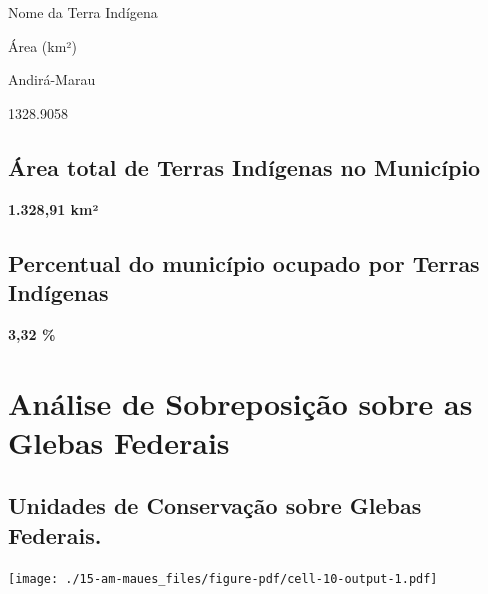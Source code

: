 \documentclass[
  letterpaper,
]{report}
\begin{document}
\n  

\n    

\n      

Nome da Terra Indígena

\n      

Área (km²)

\n    

\n  

\n  

\n    

\n      

Andirá-Marau

\n      

1328.9058

\n    

\n  

\n

\hypertarget{uxe1rea-total-de-terras-induxedgenas-no-municuxedpio}{%
\subsection{Área total de Terras Indígenas no
Município}\label{uxe1rea-total-de-terras-induxedgenas-no-municuxedpio}}

\textbf{1.328,91 km²}

\hypertarget{percentual-do-municuxedpio-ocupado-por-terras-induxedgenas}{%
\subsection{Percentual do município ocupado por Terras
Indígenas}\label{percentual-do-municuxedpio-ocupado-por-terras-induxedgenas}}

\textbf{3,32 \%}

\hypertarget{anuxe1lise-de-sobreposiuxe7uxe3o-sobre-as-glebas-federais}{%
\section{Análise de Sobreposição sobre as Glebas
Federais}\label{anuxe1lise-de-sobreposiuxe7uxe3o-sobre-as-glebas-federais}}

\hypertarget{unidades-de-conservauxe7uxe3o-sobre-glebas-federais.}{%
\subsection{Unidades de Conservação sobre Glebas
Federais.}\label{unidades-de-conservauxe7uxe3o-sobre-glebas-federais.}}

\texttt{[image: ./15-am-maues\_files/figure-pdf/cell-10-output-1.pdf]}
\end{document}
